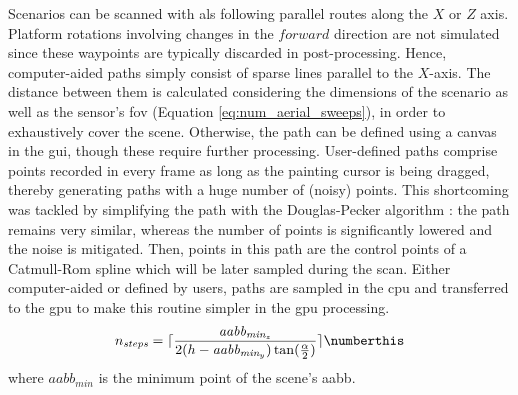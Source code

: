 Scenarios can be scanned with \acrshort{als} following parallel routes along the $X$ or $Z$ axis. Platform rotations involving changes in the $\textit{forward}$ direction are not simulated since these waypoints are typically discarded in post-processing. Hence, computer-aided paths simply consist of sparse lines parallel to the $X$-axis. The distance between them is calculated considering the dimensions of the scenario as well as the sensor's \acrshort{fov} (Equation \ref{eq:num_aerial_sweeps}), in order to exhaustively cover the scene. Otherwise, the path can be defined using a canvas in the \acrshort{gui}, though these require further processing. User-defined paths comprise points recorded in every frame as long as the painting cursor is being dragged, thereby generating paths with a huge number of (noisy) points. This shortcoming was tackled by simplifying the path with the Douglas-Pecker algorithm \cite{douglas_algorithms_1973}: the path remains very similar, whereas the number of points is significantly lowered and the noise is mitigated. Then, points in this path are the control points of a Catmull-Rom spline which will be later sampled during the scan. Either computer-aided or defined by users, paths are sampled in the \acrshort{cpu} and transferred to the \acrshort{gpu} to make this routine simpler in the \acrshort{gpu} processing. 
\begin{equation}
    n_{\textit{steps}} = \lceil{\frac{\textit{aabb}_{\textit{min}_z}}{2(h - \textit{aabb}_{\textit{min}_y})\tan(\frac{\alpha}{2})}\rceil}
    \numberthis \label{eq:num_aerial_sweeps}
\end{equation}
where $\textit{aabb}_{\textit{min}}$ is the minimum point of the scene's \acrshort{aabb}.

